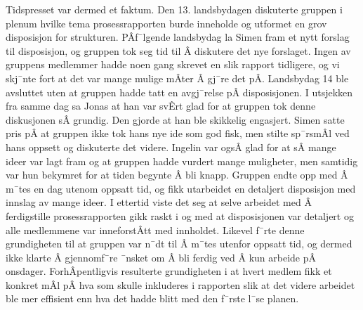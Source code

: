 Tidspresset var dermed et faktum.
Den 13. landsbydagen diskuterte gruppen i plenum hvilke tema prosessrapporten burde inneholde og utformet en grov disposisjon for strukturen.
PÂf¯lgende landsbydag la Simen fram et nytt forslag til disposisjon, og gruppen tok seg tid til Â diskutere det nye forslaget.
Ingen av gruppens medlemmer hadde noen gang skrevet en slik rapport tidligere, og vi skj¯nte fort at det var mange mulige mÂter Â gj¯re det pÂ.
Landsbydag 14 ble avsluttet uten at gruppen hadde tatt en avgj¯relse pÂ disposisjonen.
I utsjekken fra samme dag sa Jonas at han var svÊrt glad for at gruppen tok denne diskusjonen sÂ grundig. Den gjorde at han ble skikkelig engasjert.
Simen satte pris pÂ at gruppen ikke tok hans nye ide som god fisk, men stilte sp¯rsmÂl ved hans oppsett og diskuterte det videre.
Ingelin var ogsÂ glad for at sÂ mange ideer var lagt fram og at gruppen hadde vurdert mange muligheter, men samtidig var hun bekymret for at tiden begynte Â bli knapp.
Gruppen endte opp med Â m¯tes en dag utenom oppsatt tid, og fikk utarbeidet en detaljert disposisjon med innslag av mange ideer.
I ettertid viste det seg at selve arbeidet med Â ferdigstille prosessrapporten gikk raskt i og med at disposisjonen var detaljert og alle medlemmene var inneforstÂtt med innholdet.
Likevel f¯rte denne grundigheten til at gruppen var n¯dt til Â m¯tes utenfor oppsatt tid, og dermed ikke klarte Â gjennomf¯re ¯nsket om Â bli ferdig ved Â kun arbeide pÂ onsdager.
ForhÂpentligvis resulterte grundigheten i at hvert medlem fikk et konkret mÂl pÂ hva som skulle inkluderes i rapporten slik at det videre arbeidet ble mer effisient enn hva det hadde blitt med den f¯rste l¯se planen. 



